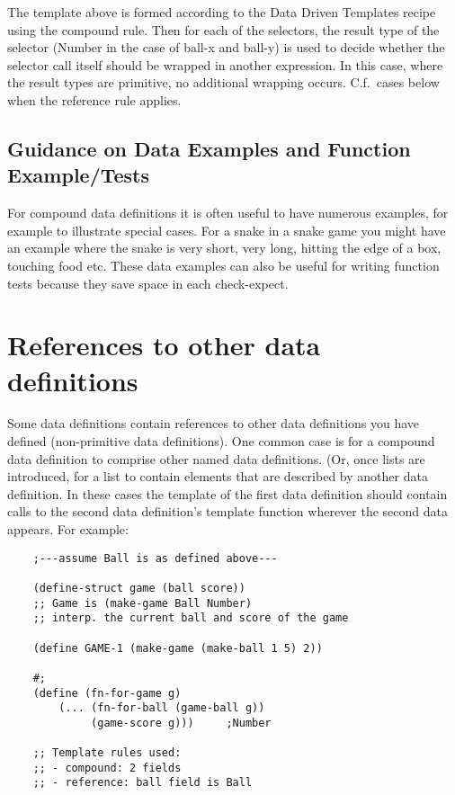 \documentclass[11pt,a4paper]{report}
\begin{document}
	The template above is formed according to the Data Driven Templates recipe using the compound
	rule. Then for each of the selectors, the result type of the selector (Number in the case of ball-x
	and ball-y) is used to decide whether the selector call itself should be wrapped in another
	expression. In this case, where the result types are primitive, no additional wrapping occurs.
	C.f.\ cases below when the reference rule applies.
	
	\subsection*{Guidance on Data Examples and Function Example/Tests}
	For compound data definitions it is often useful to have numerous examples, for example to
	illustrate special cases. For a snake in a snake game you might have an example where the snake
	is very short, very long, hitting the edge of a box, touching food etc. These data examples can
	also be useful for writing function tests because they save space in each check-expect.
	\pagebreak
	\section{References to other data definitions} \label{sec:ref_other_data_def}
	Some data definitions contain references to other data definitions you have defined (non-primitive
	data definitions). One common case is for a compound data definition to comprise other named
	data definitions. (Or, once lists are introduced, for a list to contain elements that are described by
	another data definition. In these cases the template of the first data definition should contain calls
	to the second data definition's template function wherever the second data appears. For example:
	
	\begin{verbatim}
	;---assume Ball is as defined above---
	
	(define-struct game (ball score))
	;; Game is (make-game Ball Number)
	;; interp. the current ball and score of the game
	
	(define GAME-1 (make-game (make-ball 1 5) 2))
	
	#;
	(define (fn-for-game g)
		(... (fn-for-ball (game-ball g))
		     (game-score g)))     ;Number
		     
	;; Template rules used:
	;; - compound: 2 fields
	;; - reference: ball field is Ball
	\end{verbatim}
	
\end{document}
